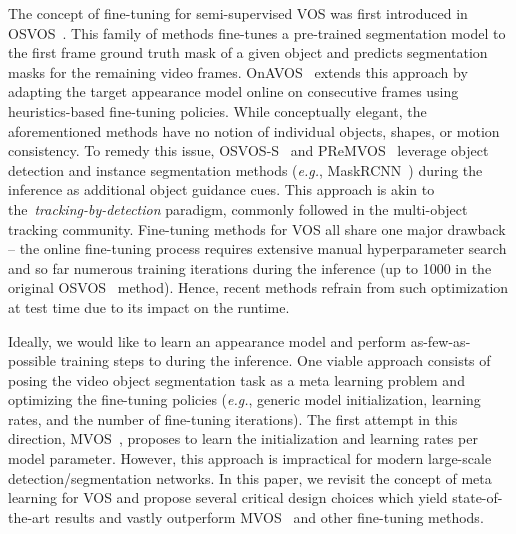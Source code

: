 \documentclass{article}
\makeatletter
\newcommand*{\eg}{\emph{e.g.}\@\xspace}
\makeatother
\begin{document}
The concept of fine-tuning for semi-supervised VOS was first introduced in OSVOS~\cite{OSVOS}.
This family of methods fine-tunes a pre-trained segmentation model to the first frame ground truth mask of a given object and predicts segmentation masks for the remaining video frames.
OnAVOS~\cite{onavos} extends this approach by adapting the target appearance model online on consecutive frames using heuristics-based fine-tuning policies.
While conceptually elegant, the aforementioned methods have no notion of individual objects, shapes, or motion consistency.
To remedy this issue, OSVOS-S~\cite{OSVOS-S} and PReMVOS~\cite{luiten2018premvos} leverage object detection and instance segmentation methods (\eg, MaskRCNN~\cite{MaskRCNN}) during the inference as additional object guidance cues.
This approach is akin to the~\textit{tracking-by-detection} paradigm, commonly followed in the multi-object tracking community.
Fine-tuning methods for VOS all share one major drawback -- the online fine-tuning process requires extensive manual hyperparameter search and so far numerous training iterations during the inference (up to 1000 in the original OSVOS~\cite{OSVOS} method).
Hence, recent methods refrain from such optimization at test time due to its impact on the runtime.

        Ideally, we would like to learn an appearance model and perform as-few-as-possible training steps to during the inference.
One viable approach consists of posing the video object segmentation task as a meta learning problem and optimizing the fine-tuning policies (\eg, generic model initialization, learning rates, and the number of fine-tuning iterations).
The first attempt in this direction, MVOS~\cite{MVOS}, proposes to learn the initialization and learning rates per model parameter.
However, this approach is impractical for modern large-scale detection/segmentation networks.
In this paper, we revisit the concept of meta learning for VOS and propose several critical design choices which yield state-of-the-art results and vastly outperform MVOS~\cite{MVOS} and other fine-tuning methods.
\end{document}
